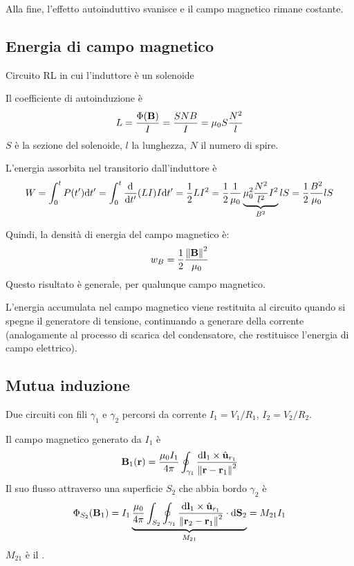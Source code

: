 Alla fine, l'effetto autoinduttivo svanisce e il campo magnetico rimane costante.

\subsection{Energia di campo magnetico}
\label{sec:energia_campo_magnetico}

Circuito RL in cui l'induttore è un solenoide

Il coefficiente di autoinduzione è
\begin{equation}
    L = \frac{\Phi(\mathbf{B})}{I} = \frac{S N B}{I} = \mu_0 S \frac{N^2}{l}
\end{equation}
$S$ è la sezione del solenoide, $l$ la lunghezza, $N$ il numero di spire.

L'energia assorbita nel transitorio dall'induttore è
\begin{equation}
    W = \int_0^t P(t') \de t'
    = \int_0^t \der{t'}(L I) I \de t'
    = \frac{1}{2} L I^2
    = \frac{1}{2} \frac{1}{\mu_0} \underbrace{\mu_0^2 \frac{N^2}{l^2} I^2}_{B^2} l S = \frac{1}{2} \frac{B^2}{\mu_0} l S
\end{equation}

Quindi, la densità di energia del campo magnetico è:
\begin{equation}
    w_B = \frac{1}{2} \frac{\left\lVert \mathbf{B} \right\rVert^2}{\mu_0}
\end{equation}
Questo risultato è generale, per qualunque campo magnetico.

L'energia accumulata nel campo magnetico viene restituita al circuito quando si spegne il generatore di tensione, continuando a generare della corrente (analogamente al processo di scarica del condensatore, che restituisce l'energia di campo elettrico).

\subsection{Mutua induzione}

Due circuiti con fili $\gamma_1$ e $\gamma_2$ percorsi da corrente $I_1 = V_1/R_1$, $I_2 = V_2/R_2$.

Il campo magnetico generato da $I_1$ è
\begin{equation}
    \mathbf{B}_1(\mathbf{r}) = \frac{\mu_0 I_1}{4\pi} \oint_{\gamma_1} \frac{\mathrm{d} \mathbf{l}_1 \times \hat{\mathbf{u}}_{r_1}}{\left\lVert \mathbf{r} - \mathbf{r}_1 \right\rVert^2}
\end{equation}
Il suo flusso attraverso una superficie $S_2$ che abbia bordo $\gamma_2$ è
\begin{equation}
    \Phi_{S_2}(\mathbf{B}_1) = I_1 \underbrace{\frac{\mu_0}{4\pi} \int_{S_2} \oint_{\gamma_1} \frac{\mathrm{d} \mathbf{l}_1 \times \hat{\mathbf{u}}_{r_1}}{\left\lVert \mathbf{r}_2 - \mathbf{r}_1 \right\rVert^2} \cdot \mathrm{d} \mathbf{S}_2}_{M_{21}} = M_{21} I_1
\end{equation}
$M_{21}$ è il .

